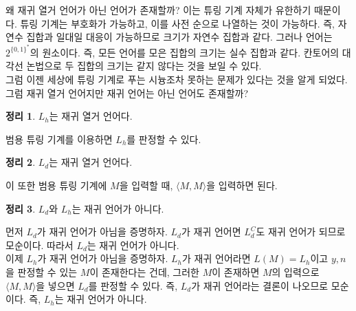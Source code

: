 \documentclass[b5paper]{book}
\theoremstyle{definition}
\newtheorem{thm}{정리}[chapter]
\newenvironment{pf*}{\pushQED{\qed}\pf}{\popQED\endpf}
\begin{document}
왜 재귀 열거 언어가 아닌 언어가 존재할까? 이는 튜링 기계 자체가 유한하기 때문이다. 튜링 기계는 부호화가 가능하고,
이를 사전 순으로 나열하는 것이 가능하다. 즉, 자연수 집합과 일대일 대응이 가능하므로 크기가 자연수 집합과 같다.
그러나 언어는 $2^{\{0,1\}^*}$의 원소이다. 즉, 모든 언어를 모은 집합의 크기는 실수 집합과 같다. 
칸토어의 대각선 논법으로 두 집합의 크기는 같지 않다는 것을 보일 수 있다. \\
그럼 이젠 세상에 튜링 기계로 푸는 시늉조차 못하는 문제가 있다는 것을 알게 되었다. 그럼
재귀 열거 언어지만 재귀 언어는 아닌 언어도 존재할까?
\begin{thm}
    $L_h$는 재귀 열거 언어다.
\end{thm}
\begin{pf*}
    범용 튜링 기계를 이용하면 $L_h$를 판정할 수 있다.
\end{pf*}
\begin{thm}
    $L_d$는 재귀 열거 언어다. 
\end{thm}
\begin{pf*}
    이 또한 범용 튜링 기계에 $M$을 입력할 때, $\langle M, M \rangle$을 입력하면 된다.
\end{pf*}
\begin{thm}
    $L_d$와 $L_h$는 재귀 언어가 아니다.
\end{thm}
\begin{pf*}
    먼저 $L_d$가 재귀 언어가 아님을 증명하자. $L_d$가 재귀 언어면 $L_d^C$도 재귀 언어가 되므로
    모순이다. 따라서 $L_d$는 재귀 언어가 아니다. \\ 
    이제 $L_h$가 재귀 언어가 아님을 증명하자. $L_h$가 재귀 언어라면 $L(M) = L_h$이고
    $y, n$을 판정할 수 있는 $M$이 존재한다는 건데, 그러한 $M$이 존재하면 $M$의 입력으로
    $\langle M, M \rangle$을 넣으면 $L_d$를 판정할 수 있다. 즉, $L_d$가 재귀 언어라는
    결론이 나오므로 모순이다. 즉, $L_h$는 재귀 언어가 아니다.
\end{pf*}
\end{document}
